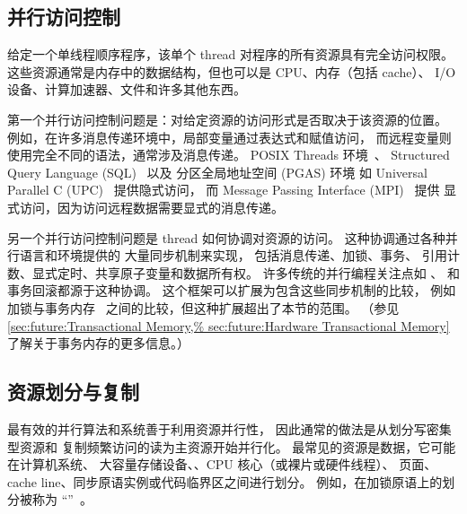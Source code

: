 \subsection{并行访问控制}
\label{sec:Parallel Access Control}

给定一个单线程顺序程序，该单个 thread 对程序的所有资源具有完全访问权限。
这些资源通常是内存中的数据结构，但也可以是 CPU、内存（包括 cache）、
I/O 设备、计算加速器、文件和许多其他东西。

第一个并行访问控制问题是：对给定资源的访问形式是否取决于该资源的位置。
例如，在许多消息传递环境中，局部变量通过表达式和赋值访问，
而远程变量则使用完全不同的语法，通常涉及消息传递。
POSIX Threads 环境~\cite{OpenGroup1997pthreads}、
Structured Query Language (SQL)~\cite{DIS9075SQL92} 以及
分区全局地址空间 (PGAS) 环境
如 Universal Parallel C (UPC)~\cite{ElGhazawi2003UPC,UPCConsortium2013}
提供隐式访问，
而 Message Passing Interface (MPI)~\cite{MPIForum2008} 提供
显式访问，因为访问远程数据需要显式的消息传递。

另一个并行访问控制问题是 thread 如何协调对资源的访问。
这种协调通过各种并行语言和环境提供的
大量同步机制来实现，
包括消息传递、加锁、事务、
引用计数、显式定时、共享原子变量和数据所有权。
许多传统的并行编程关注点如 、
 和事务回滚都源于这种协调。
这个框架可以扩展为包含这些同步机制的比较，
例如加锁与事务内存~\cite{McKenney2007PLOSTM}
之间的比较，但这种扩展超出了本节的范围。
（参见 \cref{sec:future:Transactional Memory,%
sec:future:Hardware Transactional Memory}
了解关于事务内存的更多信息。）

\QuickQuizEnd

\subsection{资源划分与复制}
\label{sec:Resource Partitioning and Replication}

最有效的并行算法和系统善于利用资源并行性，
因此通常的做法是从划分写密集型资源和
复制频繁访问的读为主资源开始并行化。
最常见的资源是数据，它可能在计算机系统、
大容量存储设备、、CPU 核心（或裸片或硬件线程）、
页面、cache line、同步原语实例或代码临界区之间进行划分。
例如，在加锁原语上的划分被称为
``''~\cite{Beck85}。

